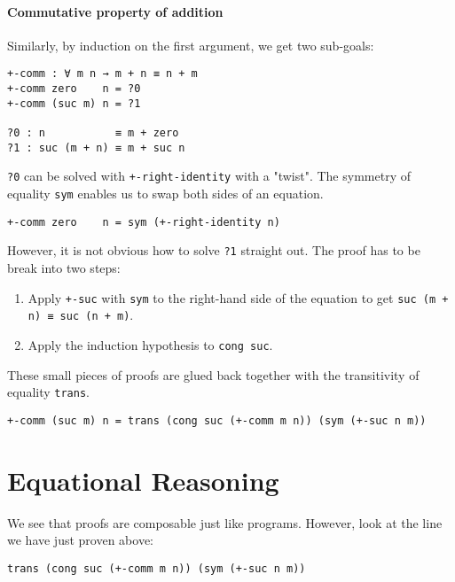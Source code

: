 \documentclass[../thesis.tex]{subfiles}
\begin{document}
\paragraph{Commutative property of addition}

Similarly, by induction on the first argument, we get two sub-goals:

\begin{lstlisting}
+-comm : ∀ m n → m + n ≡ n + m
+-comm zero    n = ?0
+-comm (suc m) n = ?1

?0 : n           ≡ m + zero
?1 : suc (m + n) ≡ m + suc n
\end{lstlisting}

{\lstinline|?0|} can be solved with {\lstinline|+-right-identity|} with a "twist".
The symmetry of equality {\lstinline|sym|} enables us to swap both sides of an equation.

\begin{lstlisting}
+-comm zero    n = sym (+-right-identity n)
\end{lstlisting}

However, it is not obvious how to solve {\lstinline|?1|} straight out.
The proof has to be break into two steps:

\begin{enumerate}
    \item Apply {\lstinline|+-suc|} with {\lstinline|sym|} to the right-hand side
    of the equation to get {\lstinline|suc (m + n) ≡ suc (n + m)|}.
    \item Apply the induction hypothesis to {\lstinline|cong suc|}.
\end{enumerate}

These small pieces of proofs are glued back together with the transitivity of
equality {\lstinline|trans|}.

\begin{lstlisting}
+-comm (suc m) n = trans (cong suc (+-comm m n)) (sym (+-suc n m))
\end{lstlisting}

\section{Equational Reasoning}

We see that proofs are composable just like programs.
However, look at the line we have just proven above:

\begin{lstlisting}
trans (cong suc (+-comm m n)) (sym (+-suc n m))
\end{lstlisting}
\end{document}
